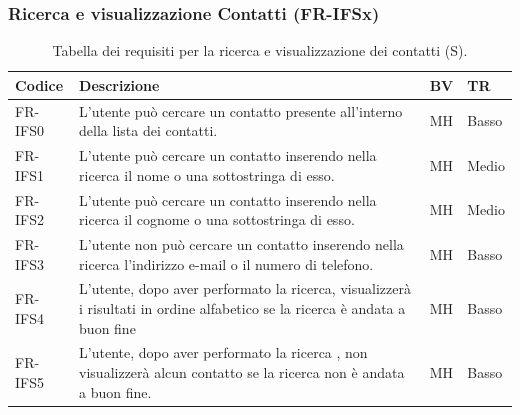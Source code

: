 \documentclass[a4paper,12pt]{article}
\begin{document}
    \subsubsection{Ricerca e visualizzazione Contatti (FR-IFSx)}
    \begin{table}[H]
        \centering
        \begin{tabular}{|l|p{8cm}|l|l|}
            \hline
            \textbf{Codice} & \textbf{Descrizione} & \textbf{BV} & \textbf{TR} \\
            \hline
            FR-IFS0 & L'utente può cercare un contatto presente all'interno della lista dei contatti. & MH & Basso \\
            \hline
            FR-IFS1 & L'utente può cercare un contatto inserendo nella ricerca il nome o una sottostringa di esso. & MH & Medio \\
            \hline
            FR-IFS2 & L'utente può cercare un contatto inserendo nella ricerca il cognome o una sottostringa di esso. & MH & Medio \\
            \hline
            FR-IFS3 & L'utente non può cercare un contatto inserendo nella ricerca l'indirizzo e-mail o il numero di telefono. & MH & Basso \\
            \hline
            FR-IFS4 & L'utente, dopo aver performato la ricerca, visualizzerà i risultati in ordine alfabetico se la ricerca è andata a buon fine & MH & Basso \\
            \hline
            FR-IFS5 & L'utente, dopo aver performato la ricerca , non visualizzerà alcun contatto se la ricerca non è andata a buon fine. & MH & Basso \\
            \hline
        \end{tabular}
        \caption{Tabella dei requisiti per la ricerca e visualizzazione dei contatti (S).}
    \end{table}
\end{document}
